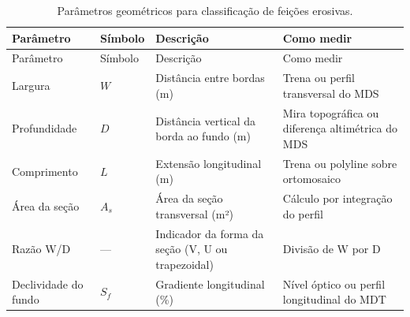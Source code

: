 \documentclass[
  portuguese,
  11pt,
  a4paper,
  open=any]{scrbook}
\begin{document}
\begin{longtable}[]{@{}
  >{\raggedright\arraybackslash}p{}
  >{\raggedright\arraybackslash}p{}
  >{\raggedright\arraybackslash}p{}
  >{\raggedright\arraybackslash}p{}@{}}
\caption{Parâmetros geométricos para classificação de feições
erosivas.}\label{tbl-parametros}\tabularnewline
\toprule\noalign{}
\begin{minipage}[b]{\linewidth}\raggedright
Parâmetro
\end{minipage} & \begin{minipage}[b]{\linewidth}\raggedright
Símbolo
\end{minipage} & \begin{minipage}[b]{\linewidth}\raggedright
Descrição
\end{minipage} & \begin{minipage}[b]{\linewidth}\raggedright
Como medir
\end{minipage} \\
\midrule\noalign{}
\endfirsthead
\toprule\noalign{}
\begin{minipage}[b]{\linewidth}\raggedright
Parâmetro
\end{minipage} & \begin{minipage}[b]{\linewidth}\raggedright
Símbolo
\end{minipage} & \begin{minipage}[b]{\linewidth}\raggedright
Descrição
\end{minipage} & \begin{minipage}[b]{\linewidth}\raggedright
Como medir
\end{minipage} \\
\midrule\noalign{}
\endhead
\bottomrule\noalign{}
\endlastfoot
Largura & \(W\) & Distância entre bordas (m) & Trena ou perfil
transversal do MDS \\
Profundidade & \(D\) & Distância vertical da borda ao fundo (m) & Mira
topográfica ou diferença altimétrica do MDS \\
Comprimento & \(L\) & Extensão longitudinal (m) & Trena ou polyline
sobre ortomosaico \\
Área da seção & \(A_s\) & Área da seção transversal (m²) & Cálculo por
integração do perfil \\
Razão W/D & --- & Indicador da forma da seção (V, U ou trapezoidal) &
Divisão de W por D \\
Declividade do fundo & \(S_f\) & Gradiente longitudinal (\%) & Nível
óptico ou perfil longitudinal do MDT \\
\end{longtable}
\end{document}
